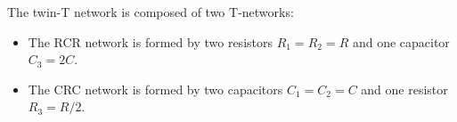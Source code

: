 The twin-T network is composed of two T-networks: 
\begin{itemize}
\item The RCR network is formed by two resistors $R_1=R_2=R$ and one
  capacitor $C_3=2C$. 

  \begin{comment}
  This T (or Y) network can be converted to a $\pi$ (or $\Delta$) network (see 
  \htmladdnormallink{here}{http://fourier.eng.hmc.edu/e84/lectures/ch2/node3.html}) of three branches:
  \[
  Z'_1=Z'_2=R+\frac{1}{2j\omega C}+\frac{R/2j\omega C}{R}
  =R+\frac{1}{j\omega C}=\frac{j\omega RC+1}{j\omega C}
  \]
  \[
  Z'_3=R+R+\frac{R^2}{1/2j\omega C}=2R+2R^2j\omega C=2R(1+j\omega RC)
  \]
  The frequency response function of the voltage divider formed by 
  $Z'_3$ and $Z'_2$ is:
  \begin{eqnarray}
  H'(j\omega)&=&\frac{Z'_2}{Z'_2+Z'_3}
  =\frac{(1+j\omega RC)/j\omega C}{(1+j\omega RC)/j\omega C+2R(1+j\omega RC)}
  \nonumber\\
  &=&\frac{1}{1+2j\omega RC}=\frac{1}{1+2j\omega\tau}
  \nonumber
  \end{eqnarray}
  where $\tau=RC$. This is a first-order low-pass filter with cut-off
  frequency at $\omega_c=1/2\tau$:
  \[
  |H'(j\omega)|=\left\{\begin{array}{ll}1 & \omega=0\\1/\sqrt{2}& 
  \omega=1/2\tau\\ 0&\omega\rightarrow\infty\end{array}\right.
  \]
  \end{comment}

\item The CRC network is formed by two capacitors $C_1=C_2=C$ and one
  resistor $R_3=R/2$. 

  \begin{comment}
  This T (or Y) network can be converted to a
  $\pi$ (or $\Delta$) network of three branches:
  \[
  Z''_1=Z''_2=\frac{R}{2}+\frac{1}{j\omega C}+\frac{R/2j\omega C}{1/j\omega C}
  =R+\frac{1}{j\omega C}  =\frac{j\omega RC+1}{j\omega C}
  \]
  \[
  Z''_3=\frac{1}{j\omega C}+\frac{1}{j\omega C}+\frac{1/(j\omega C)^2}{R/2}
  =\frac{2}{j\omega C}+\frac{2}{R(j\omega C)^2}
  =\frac{2(1+j\omega RC)}{R(j\omega C)^2}
  \]
  The frequency response function of the voltage divider formed by $Z''_3$ 
  and $Z''_2$ is:
  \begin{eqnarray}
  H''(j\omega)&=&\frac{Z''_2}{Z''_2+Z''_3}
  =\frac{(1+j\omega RC)/j\omega C}
  {(1+j\omega RC)/j\omega C+2(1+j\omega RC)/R(j\omega C)^2}
  \nonumber \\
  &=&\frac{j\omega RC}{j\omega RC+2}=\frac{j\omega\tau}{j\omega\tau+2}
  =\frac{1}{1-j2/\omega\tau}
  \nonumber 
  \end{eqnarray}
  This is a first-order high-pass filter with cut-off frequency at
  $\omega_c=2/\tau$:
  \[
  |H'(j\omega)|=\left\{\begin{array}{ll}0 & \omega=0\\1/\sqrt{2}& 
  \omega=2/\tau\\ 1&\omega\rightarrow\infty\end{array}\right.
  \]
  \end{comment}


\end{itemize}

